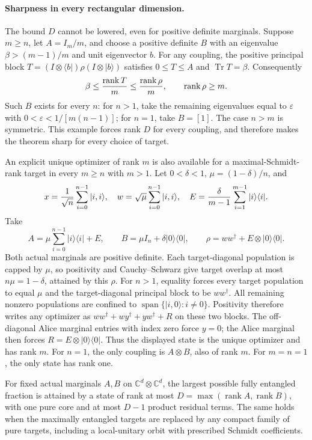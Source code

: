 \paragraph{Sharpness in every rectangular dimension.}
The bound $D$ cannot be lowered, even for positive definite marginals.
Suppose $m\ge n$, let $A=I_m/m$, and choose a positive definite $B$ with
an eigenvalue $\beta>(m-1)/m$ and unit eigenvector $b$. For any coupling,
the positive principal block
$T=(I\otimes\langle b|)\rho(I\otimes|b\rangle)$ satisfies
$0\le T\le A$ and $\operatorname{Tr}T=\beta$. Consequently
\[
       \beta\le {\operatorname{rank}T\over m}
             \le {\operatorname{rank}\rho\over m},
       \qquad \operatorname{rank}\rho\ge m.
\]
Such $B$ exists for every $n$: for $n>1$, take the remaining eigenvalues
equal to $\varepsilon$ with
$0<\varepsilon<1/[m(n-1)]$; for $n=1$, take $B=[1]$. The case $n>m$
is symmetric. This example forces rank $D$ for every coupling, and
therefore makes the theorem sharp for every choice of target.

An explicit unique optimizer of rank $m$ is also available for a
maximal-Schmidt-rank target in every $m\ge n$ with $m>1$. Let
$0<\delta<1$, $\mu=(1-\delta)/n$, and
\[
 x={1\over\sqrt n}\sum_{i=0}^{n-1}|i,i\rangle,
 \quad w=\sqrt\mu\sum_{i=0}^{n-1}|i,i\rangle,
 \quad E={\delta\over m-1}\sum_{i=1}^{m-1}|i\rangle\langle i|.
\]
Take
\[
 A=\mu\sum_{i=0}^{n-1}|i\rangle\langle i|+E,
 \qquad B=\mu I_n+\delta|0\rangle\langle0|,
 \qquad \rho=ww^\dagger+E\otimes|0\rangle\langle0|.
\]
Both actual marginals are positive definite. Each target-diagonal
population is capped by $\mu$, so positivity and Cauchy--Schwarz give
target overlap at most $n\mu=1-\delta$, attained by this $\rho$.
For $n>1$, equality forces every target population to equal $\mu$ and
the target-diagonal principal block to be $ww^\dagger$. All remaining
nonzero populations are confined to
$\operatorname{span}\{|i,0\rangle:i\ne0\}$. Positivity therefore
writes any optimizer as
$ww^\dagger+wy^\dagger+yw^\dagger+R$ on these two blocks.
The off-diagonal Alice marginal entries with index zero force $y=0$;
the Alice marginal then forces $R=E\otimes|0\rangle\langle0|$.
Thus the displayed state is the unique optimizer and has rank $m$.
For $n=1$, the only coupling is $A\otimes B$, also of rank $m$.
For $m=n=1$, the only state has rank one.

\begin{corollary}
For fixed actual marginals $A,B$ on $\mathbb C^d\otimes\mathbb C^d$,
the largest possible fully entangled fraction is attained by a state of
rank at most $D=\max(\operatorname{rank}A,\operatorname{rank}B)$, with
one pure core and at most $D-1$ product residual terms. The same holds
when the maximally entangled targets are replaced by any compact family
of pure targets, including a local-unitary orbit with prescribed Schmidt
coefficients.
\end{corollary}

